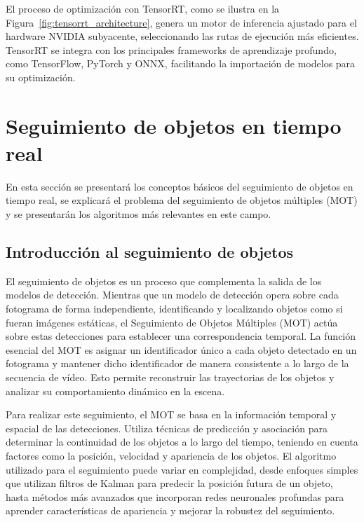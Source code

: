 \documentclass[11pt,spanish,listoffigures,listoftables]{tfgetsinf}
\begin{document}
El proceso de optimización con TensorRT, como se ilustra en la Figura~\ref{fig:tensorrt_architecture}, genera un motor de inferencia ajustado para el hardware NVIDIA subyacente, seleccionando las rutas de ejecución más eficientes. TensorRT se integra con los principales frameworks de aprendizaje profundo, como TensorFlow, PyTorch y ONNX, facilitando la importación de modelos para su optimización.



\section{Seguimiento de objetos en tiempo real}
En esta sección se presentará los conceptos básicos del seguimiento de objetos en tiempo real, se explicará el problema del seguimiento de objetos múltiples (MOT) y se presentarán los algoritmos más relevantes en este campo.

\subsection{Introducción al seguimiento de objetos}
El seguimiento de objetos es un proceso que complementa la salida de los modelos de detección. Mientras que un modelo de detección opera sobre cada fotograma de forma independiente, identificando y localizando objetos como si fueran imágenes estáticas, el Seguimiento de Objetos Múltiples (MOT) actúa sobre estas detecciones para establecer una correspondencia temporal. La función esencial del MOT es asignar un identificador único a cada objeto detectado en un fotograma y mantener dicho identificador de manera consistente a lo largo de la secuencia de vídeo. Esto permite reconstruir las trayectorias de los objetos y analizar su comportamiento dinámico en la escena.

Para realizar este seguimiento, el MOT se basa en la información temporal y espacial de las detecciones. Utiliza técnicas de predicción y asociación para determinar la continuidad de los objetos a lo largo del tiempo, teniendo en cuenta factores como la posición, velocidad y apariencia de los objetos. El algoritmo utilizado para el seguimiento puede variar en complejidad, desde enfoques simples que utilizan filtros de Kalman para predecir la posición futura de un objeto, hasta métodos más avanzados que incorporan redes neuronales profundas para aprender características de apariencia y mejorar la robustez del seguimiento.
\end{document}
